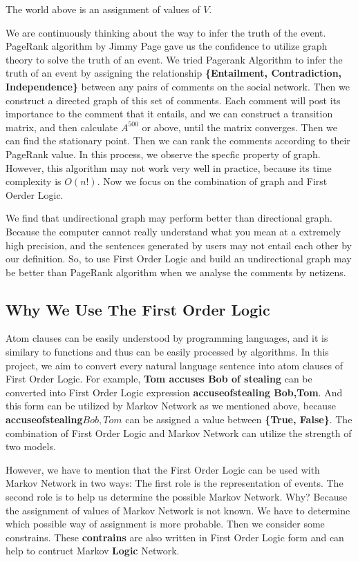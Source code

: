 \documentclass[
12pt, %
a4paper, %
oneside, %
headinclude,footinclude, %
BCOR5mm, %
]{scrartcl}
\begin{document}
The world above is an assignment of values of $V$.

We are continuously thinking about the way to infer the truth of the event. PageRank algorithm by Jimmy Page gave us the
confidence to utilize graph theory to solve the truth of an event. We tried Pagerank Algorithm to infer the truth of an
event by assigning the relationship \textbf{\{Entailment, Contradiction, Independence\}} between any pairs of comments on
the social network. Then we construct a directed graph of this set of comments. Each comment will post its importance to
the comment that it entails, and we can construct a transition matrix, and then calculate $A^500$ or above, until the matrix
converges. Then we can find the stationary point. Then we can rank the comments according to their PageRank value. In this process,
we observe the specfic property of graph. However, this algorithm may not work very well in practice, because its time complexity is $O(n!)$. 
Now we focus on the combination of graph and First Oerder Logic. 

We find that undirectional graph may perform better than directional graph. Because the computer cannot really understand what you mean at a extremely high
precision, and the sentences generated by users may not entail each other by our definition. So, to use First Order Logic and build an undirectional graph may be better than PageRank algorithm when we analyse the comments by netizens.

\subsection{Why We Use The First Order Logic}
Atom clauses can be easily understood by programming languages, and it is similary to functions and thus can be easily processed by algorithms. In this project, we aim to convert every natural language sentence into atom clauses of First Order Logic. For example, \textbf{Tom accuses Bob of stealing} can be converted into First Order Logic expression \textbf{accuseofstealing Bob,Tom}. And this form can be utilized by Markov Network as we mentioned above, because \textbf{accuseofstealing\(Bob,Tom\)} can be assigned a value between \textbf{\{True, False\}}. The combination of First Order Logic and Markov Network can utilize the strength of two models.

However, we have to mention that the First Order Logic can be used with Markov Network in two ways: The first role is the representation of events. The second role is to help us determine the possible Markov Network. Why? Because the assignment of values of Markov Network is not known. We have to determine which possible way of assignment is more probable. Then we consider some constrains. These \textbf{contrains} are also written in First Order Logic form and can help to contruct Markov \textbf{Logic} Network. 
\end{document}
